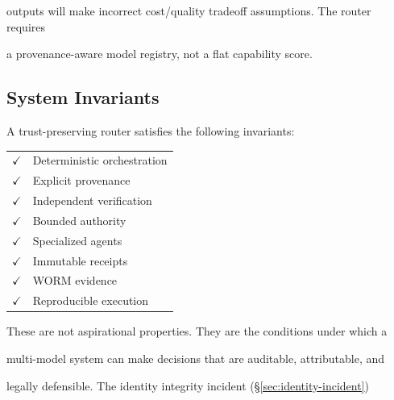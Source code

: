 outputs will make incorrect cost/quality tradeoff assumptions. The router requires


a provenance-aware model registry, not a flat capability score.





\subsection{System Invariants}





A trust-preserving router satisfies the following invariants:





\begin{center}


\begin{tabular}{cl}


$\checkmark$ & Deterministic orchestration \\


$\checkmark$ & Explicit provenance \\


$\checkmark$ & Independent verification \\


$\checkmark$ & Bounded authority \\


$\checkmark$ & Specialized agents \\


$\checkmark$ & Immutable receipts \\


$\checkmark$ & WORM evidence \\


$\checkmark$ & Reproducible execution \\


\end{tabular}


\end{center}





These are not aspirational properties. They are the conditions under which a


multi-model system can make decisions that are auditable, attributable, and


legally defensible. The identity integrity incident (\S\ref{sec:identity-incident})


